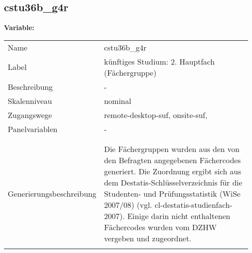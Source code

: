 	
	
	\subsection{cstu36b\_g4r}
	\label{subSection:cstu36b_g4r}

	\noindent\textbf{Variable:}\\
		\begin{tabular}{lL{11.3cm}}
			\label{tableVariable:cstu36b_g4r}
			Name & cstu36b\_g4r \\
			Label & künftiges Studium: 2. Hauptfach (Fächergruppe) \\
			Beschreibung & - \\
			Skalenniveau & nominal \\
			Zugangswege &
				remote-desktop-suf,
				onsite-suf,
 \\
			Panelvariablen & -
			 \\
			 \\
 \\
					Generierungsbeschreibung & Die Fächergruppen wurden aus den von den Befragten angegebenen Fächercodes generiert. Die Zuordnung ergibt sich aus dem Destatis-Schlüsselverzeichnis für die Studenten- und Prüfungsstatistik (WiSe 2007/08) (vgl. cl-destatis-studienfach-2007).  Einige darin nicht enthaltenen Fächercodes wurden vom DZHW vergeben und zugeordnet. 
				 \\	
			 \\
		\end{tabular}






